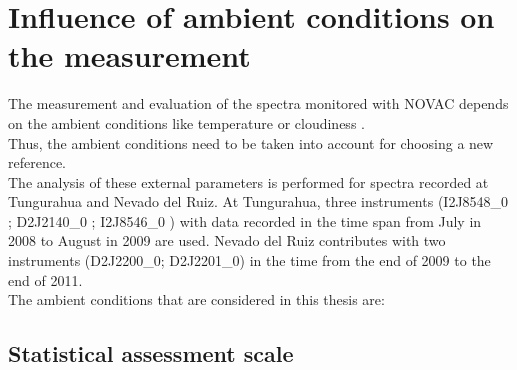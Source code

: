 \section{Influence of ambient conditions on the measurement \label{Chap:BROErr}}
The measurement and evaluation of the spectra monitored with NOVAC depends on the ambient conditions like temperature or cloudiness \citep{lubcke2014optical}.\\
Thus, the ambient conditions need to be taken into account for choosing a new reference.\\
The analysis of these external parameters is performed for spectra recorded at Tungurahua and Nevado del Ruiz. At Tungurahua, three instruments (I2J8548\_0 ; D2J2140\_0 ; I2J8546\_0 ) with data recorded in the time span from July in 2008 to August in 2009 are used. Nevado del Ruiz contributes with two instruments (D2J2200\_0; D2J2201\_0) in the time from the end of 2009 to the end of 2011.\\
%
The ambient conditions that are considered in this thesis are:
\begin{table}[h!]
    \centering
\end{table}    
%



\subsection{Statistical assessment scale}

